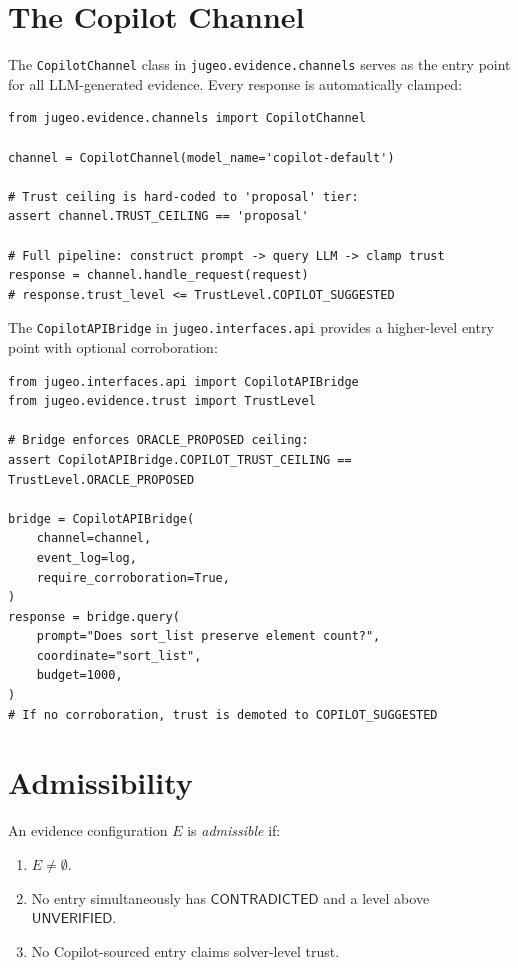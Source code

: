 \documentclass[11pt]{article}
\newcommand{\Unver}{\mathsf{UNVERIFIED}}
\newcommand{\Contra}{\mathsf{CONTRADICTED}}
\begin{document}
\section{The Copilot Channel}\label{sec:channel}

The \texttt{CopilotChannel} class in \texttt{jugeo.evidence.channels} serves
as the entry point for all LLM-generated evidence.  Every response is
automatically clamped:

\begin{lstlisting}[style=jugeo-python]
from jugeo.evidence.channels import CopilotChannel

channel = CopilotChannel(model_name='copilot-default')

# Trust ceiling is hard-coded to 'proposal' tier:
assert channel.TRUST_CEILING == 'proposal'

# Full pipeline: construct prompt -> query LLM -> clamp trust
response = channel.handle_request(request)
# response.trust_level <= TrustLevel.COPILOT_SUGGESTED
\end{lstlisting}

The \texttt{CopilotAPIBridge} in \texttt{jugeo.interfaces.api} provides a
higher-level entry point with optional corroboration:

\begin{lstlisting}[style=jugeo-python]
from jugeo.interfaces.api import CopilotAPIBridge
from jugeo.evidence.trust import TrustLevel

# Bridge enforces ORACLE_PROPOSED ceiling:
assert CopilotAPIBridge.COPILOT_TRUST_CEILING == TrustLevel.ORACLE_PROPOSED

bridge = CopilotAPIBridge(
    channel=channel,
    event_log=log,
    require_corroboration=True,
)
response = bridge.query(
    prompt="Does sort_list preserve element count?",
    coordinate="sort_list",
    budget=1000,
)
# If no corroboration, trust is demoted to COPILOT_SUGGESTED
\end{lstlisting}

\section{Admissibility}\label{sec:admissible}

\begin{definition}\label{def:admissible}
An evidence configuration $E$ is \emph{admissible} if:
\begin{enumerate}[leftmargin=2em]
  \item $E \neq \emptyset$.
  \item No entry simultaneously has $\Contra$ and a level above $\Unver$.
  \item No Copilot-sourced entry claims solver-level trust.
\end{enumerate}
\end{definition}
\end{document}
